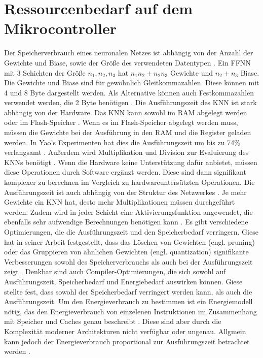\section{Ressourcenbedarf auf dem Mikrocontroller}
Der Speicherverbrauch eines neuronalen Netzes ist abhängig von der Anzahl der Gewichte und Biase, sowie der Größe des verwendeten Datentypen \cite{kubikThesis}.
Ein FFNN mit 3 Schichten der Größe $n_1, n_2, n_3$ hat $n_1 n_2 + n_2 n_3$ Gewichte und $n_2 + n_3$ Biase.
Die Gewichte und Biase sind für gewöhnlich Gleitkommazahlen. Diese können mit 4 und 8 Byte dargestellt werden.
Als Alternative können auch Festkommazahlen verwendet werden, die 2 Byte benötigen \cite{gieseThesis}.
\newline
\newline
Die Ausführungszeit des KNN ist stark abhängig von der Hardware.
Das KNN kann sowohl im RAM abgelegt werden oder im Flash-Speicher \cite{engelhardtThesis}.
Wenn es im Flash-Speicher abgelegt werden muss, müssen die Gewichte bei der Ausführung in den RAM und die Register geladen werden.
In Yao's Experimenten hat dies die Ausführungszeit um bis zu 74\% verlangsamt \cite{yaoThesis}.
\newline
\newline
Außerdem wird Multiplikation und Division zur Evaluierung des KNNs benötigt \cite{engelhardtThesis}.
Wenn die Hardware keine Unterstützung dafür anbietet, müssen diese Operationen durch Software ergänzt werden.
Diese sind dann signifikant komplexer zu berechnen im Vergleich zu hardwareuntersützten Operationen.
\newline
\newline
Die Ausführungszeit ist auch abhängig von der Struktur des Netzwerkes \cite{gieseThesis}.
Je mehr Gewichte ein KNN hat, desto mehr Multiplikationen müssen durchgeführt werden.
Zudem wird in jeder Schicht eine Aktivierungsfunktion angewendet, die ebenfalls sehr aufwendige Berechnungen benötigen kann \cite{venzkeArticle}.
\newline
\newline
Es gibt verschiedene Optimierungen, die die Ausführungszeit und den Speicherbedarf verringern.
Giese hat in seiner Arbeit festgestellt, dass das Löschen von Gewichten (engl. pruning) oder das Gruppieren von ähnlichen Gewichten (engl. quantization)
signifikante Verbesserungen sowohl des Speicherverbrauchs als auch bei der Ausführungszeit zeigt \cite{gieseThesis}.
Denkbar sind auch Compiler-Optimierungen, die sich sowohl auf Ausführungszeit, Speicherbedarf und Energiebedarf auswirken können.
Giese stellte fest, dass sowohl der Speicherbedarf verringert werden kann, als auch die Ausführungszeit.
\newline
\newline
Um den Energieverbrauch zu bestimmen ist ein Energiemodell nötig, das den Energieverbrauch von einzelenen Instruktionen
im Zusammenhang mit Speicher und Caches genau beschreibt \cite{roth2018measuring}.
Diese sind aber durch die Komplexität moderner Architekturen nicht verfügbar oder ungenau.
Allgmein kann jedoch der Energieverbrauch proportional zur Ausführungszeit betrachtet werden \cite{corral2014can}.